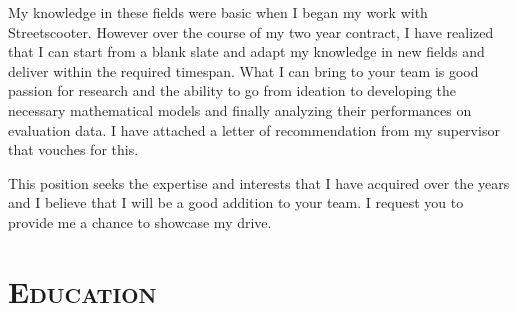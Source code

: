 \documentclass[11pt,a4paper,roman]{moderncv} %
\begin{document}
My knowledge in these fields were basic when I began my work with Streetscooter. However over the course of my two year contract, 
I have realized that I can start from a blank slate and adapt my knowledge in new fields and deliver within the required timespan.
What I can bring to your team is good passion for research and the ability to go from ideation to developing the necessary mathematical models 
and finally analyzing their performances on evaluation data. I have attached a letter of recommendation from my supervisor that vouches for this.

This position seeks the expertise and interests that I have acquired over the years and I believe that I will be a good addition to your team. 
I request you to provide me a chance to showcase my drive.

\vspace{20pt}
\makeletterclosing %





\newpage

%

\makecvtitle %


\section{\scshape{\huge Education}}

\vspace{10pt}
\end{document}

